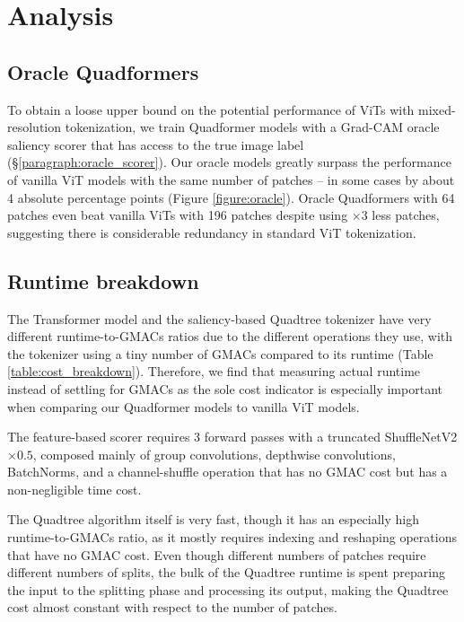 \section{Analysis}



\subsection{Oracle Quadformers}
To obtain a loose upper bound on the potential performance of ViTs with mixed-resolution tokenization, we train Quadformer models with a Grad-CAM oracle saliency scorer that has access to the true image label (\S\ref{paragraph:oracle_scorer}). Our oracle models greatly surpass the performance of vanilla ViT models with the same number of patches -- in some cases by about 4 absolute percentage points (Figure \ref{figure:oracle}). Oracle Quadformers with 64 patches even beat vanilla ViTs with 196 patches despite using $\times 3$ less patches, suggesting there is considerable redundancy in standard ViT tokenization.


\subsection{Runtime breakdown}
The Transformer model and the saliency-based Quadtree tokenizer have very different runtime-to-GMACs ratios due to the different operations they use, with the tokenizer using a tiny number of GMACs compared to its runtime (Table \ref{table:cost_breakdown}). Therefore, we find that measuring actual runtime instead of settling for GMACs as the sole cost indicator is especially important when comparing our Quadformer models to vanilla ViT models.

The feature-based scorer requires 3 forward passes with a truncated ShuffleNetV2$\times0.5$, composed mainly of group convolutions, depthwise convolutions, BatchNorms, and a channel-shuffle operation that has no GMAC cost but has a non-negligible time cost.

The Quadtree algorithm itself is very fast, though it has an especially high runtime-to-GMACs ratio, as it mostly requires indexing and reshaping operations that have no GMAC cost. Even though different numbers of patches require different numbers of splits, the bulk of the Quadtree runtime is spent preparing the input to the splitting phase and processing its output, making the Quadtree cost almost constant with respect to the number of patches.

